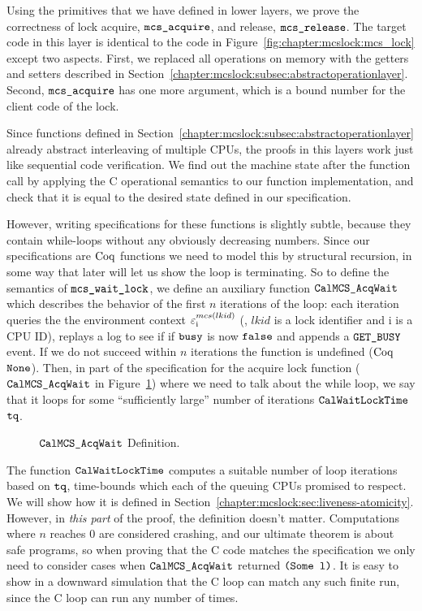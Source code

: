 Using the primitives that we have defined in lower layers, we prove the correctness of lock acquire, ${\mathrm{\texttt{mcs\_acquire}}}$, and release, ${\mathrm{\texttt{mcs\_release}}}$.
The target code in this layer is identical to the code in Figure~\ref{fig:chapter:mcslock:mcs_lock} except two aspects. 
First, we replaced all operations on memory with the getters and setters described in Section~\ref{chapter:mcslock:subsec:abstractoperationlayer}.
Second, ${\mathrm{\texttt{mcs\_acquire}}}$ has one more
 argument, which is a bound number for the client code of the lock.

Since functions defined in
Section~\ref{chapter:mcslock:subsec:abstractoperationlayer} already abstract interleaving
of multiple CPUs, the proofs in this layers work just like sequential
code verification. We find out the machine state after the function
call by applying the C operational semantics to our function
implementation, and check that it is equal to the desired state
defined in our specification.

However, writing specifications for these functions is slightly subtle, 
because they contain
while-loops without any obviously decreasing numbers. Since our
specifications are $\mathrm{Coq}$ functions we need to model this by structural
recursion, in some way that later will let us show the loop is terminating.
So to define the semantics of ${\mathrm{\texttt{mcs\_wait\_lock}}}$,
we define an auxiliary function
${\mathrm{\texttt{CalMCS\_AcqWait}}}$ which describes the
behavior of the first $n$ iterations of the loop: each iteration
queries the the environment context ${\varepsilon}^{mcs(lkid)}_{\mathrm{i}}$ (\ie,  $lkid$ is a lock identifier and $\mathrm{i}$ is a CPU ID), replays a log to see if if ${\mathrm{\texttt{busy}}}$ is now ${{\mathrm{\texttt{false}}}}$ and appends a ${\mathrm{\texttt{GET\_BUSY}}}$ event.
If we do not succeed within $n$ iterations the function is undefined ($\mathrm{Coq}$ ${\mathrm{\texttt{None}}}$).
Then, in  part of the  specification for the  acquire lock 
function (${\mathrm{\texttt{CalMCS\_AcqWait}}}$ in Figure~\ref{fig:chapter:mcslock:calmcsacqwait}) where we need to talk about the while loop,
we say that it loops for some ``sufficiently large'' 
number of iterations ${\mathrm{\texttt{CalWaitLockTime}}}$  ${\mathrm{\texttt{tq}}}$. 
\begin{figure}

\caption{${\mathrm{\texttt{CalMCS\_AcqWait}}}$ Definition.}
\label{fig:chapter:mcslock:calmcsacqwait}
\end{figure}
The function ${\mathrm{\texttt{CalWaitLockTime}}}$ computes a suitable 
number of loop iterations based on ${\mathrm{\texttt{tq}}}$, time-bounds  which each of the queuing CPUs promised to respect.
We will show how it is defined in Section~\ref{chapter:mcslock:sec:liveness-atomicity}. 
However, in \emph{this part} of the proof, the definition doesn't matter. 
Computations where $n$ reaches 0 are considered crashing, and our
ultimate theorem is about safe programs, so when proving that the C
code matches the specification we only need to 
consider cases when ${\mathrm{\texttt{CalMCS\_AcqWait}}}$ returned ${\mathrm{\texttt{(}}}{\mathrm{\texttt{Some}}}{\mathrm{\texttt{ l)}}}$.
It is easy to show in a downward simulation that the C loop can match any such finite run, 
since the C loop can run any number of times.

